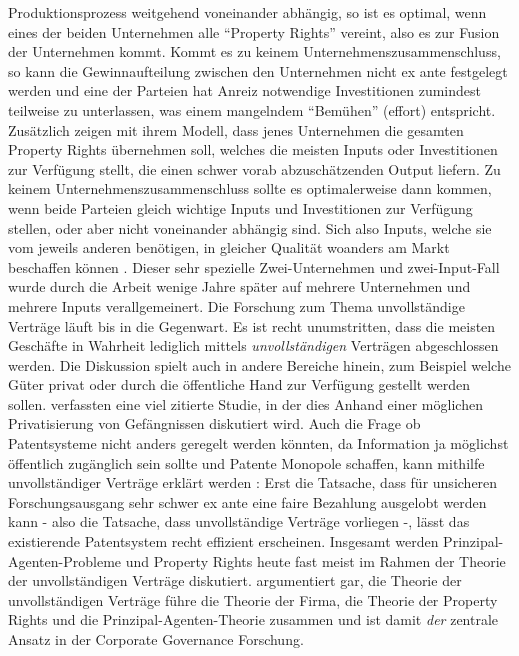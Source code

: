 Produktionsprozess weitgehend voneinander abhängig, so ist es optimal, wenn eines der beiden Unternehmen alle "`Property Rights"' vereint, also es zur Fusion der Unternehmen kommt. Kommt es zu keinem Unternehmenszusammenschluss, so kann die Gewinnaufteilung zwischen den Unternehmen nicht ex ante festgelegt werden und eine der Parteien hat Anreiz notwendige Investitionen zumindest teilweise zu unterlassen, was einem mangelndem "`Bemühen"' (effort) entspricht. Zusätzlich zeigen \textcite{Hart1986} mit ihrem Modell, dass jenes Unternehmen die gesamten Property Rights übernehmen soll, welches die meisten Inputs oder Investitionen zur Verfügung stellt, die einen schwer vorab abzuschätzenden Output liefern. Zu keinem Unternehmenszusammenschluss sollte es optimalerweise dann kommen, wenn beide Parteien gleich wichtige Inputs und Investitionen zur Verfügung stellen, oder aber nicht voneinander abhängig sind. Sich also Inputs, welche sie vom jeweils anderen benötigen, in gleicher Qualität woanders am Markt beschaffen können \parencite[S. 21]{Nobelpreis-Komitee2016}. Dieser sehr spezielle Zwei-Unternehmen und zwei-Input-Fall wurde durch die Arbeit \textcite{Hart1990} wenige Jahre später auf mehrere Unternehmen und mehrere Inputs verallgemeinert. 
Die Forschung zum Thema unvollständige Verträge läuft bis in die Gegenwart. Es ist recht unumstritten, dass die meisten Geschäfte in Wahrheit lediglich mittels \textit{unvollständigen} Verträgen abgeschlossen werden. Die Diskussion spielt auch in andere Bereiche hinein, zum Beispiel welche Güter privat oder durch die öffentliche Hand zur Verfügung gestellt werden sollen. \textcite{Hart1997} verfassten eine viel zitierte Studie, in der dies Anhand einer möglichen Privatisierung von Gefängnissen diskutiert wird. Auch die Frage ob Patentsysteme nicht anders geregelt werden könnten, da Information ja möglichst öffentlich zugänglich sein sollte und Patente Monopole schaffen, kann mithilfe unvollständiger Verträge erklärt werden \parencite{Tirole1999}: Erst die Tatsache, dass für unsicheren Forschungsausgang sehr schwer ex ante eine faire Bezahlung ausgelobt werden kann - also die Tatsache, dass unvollständige Verträge vorliegen -, lässt das existierende Patentsystem recht effizient erscheinen. Insgesamt werden Prinzipal-Agenten-Probleme und Property Rights heute fast meist im Rahmen der Theorie der unvollständigen Verträge \parencite{Shleifer1997} diskutiert. \textcite[S. 183]{Aghion2011} argumentiert gar, die Theorie der unvollständigen Verträge führe die Theorie der Firma, die Theorie der Property Rights und die Prinzipal-Agenten-Theorie zusammen und ist damit \textit{der} zentrale Ansatz in der Corporate Governance Forschung.

